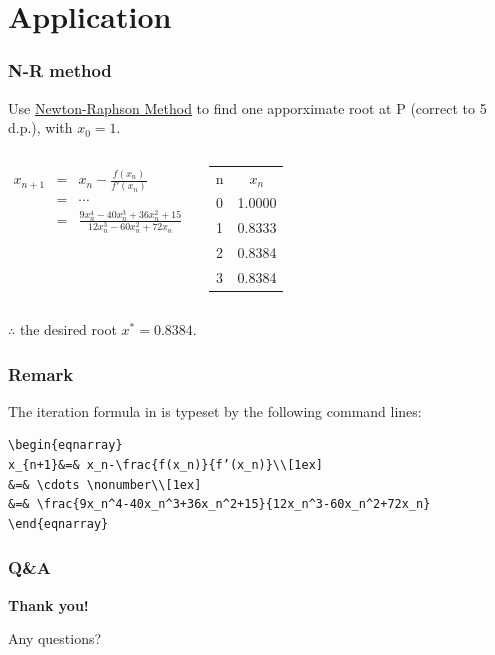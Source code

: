 \documentclass{beamer}
\begin{document}
\section{Application}
\begin{frame} %
\frametitle{N-R method}
Use \underline{Newton-Raphson Method} to find one apporximate root at P (correct to 5 d.p.), with $x_0 = 1$.
\begin{columns}
\begin{eqnarray}
x_{n+1}&=&x_n-\frac{f(x_n)}{f'(x_n)}\\
&=&\cdots\nonumber\\
&=&\frac{9x^4_n - 40x^3_n + 36x^2_n + 15}{12x^3_n - 60x^2_n + 72x_n}
\end{eqnarray}
\begin{tabular}{|c|c|}
n&$x_n$\\
0&1.0000\\
1 &0.8333\\
2 &0.8384\\
3 &0.8384\\
\end{tabular}
\end{columns}
\vfill
$\therefore$ the desired root $x^* = 0.8384.$

\end{frame}
\begin{frame}[fragile] %
\frametitle{Remark}
The iteration formula in \hyperlink{frame8}{} is typeset by the following command lines:
\begin{verbatim}
\begin{eqnarray}
x_{n+1}&=& x_n-\frac{f(x_n)}{f’(x_n)}\\[1ex]
&=& \cdots \nonumber\\[1ex]
&=& \frac{9x_n^4-40x_n^3+36x_n^2+15}{12x_n^3-60x_n^2+72x_n}
\end{eqnarray}
\end{verbatim}
\end{frame}
\begin{frame} %
\frametitle{Q\&A}
\textbf{Thank you!}

Any questions?
\end{frame}
\end{document}
